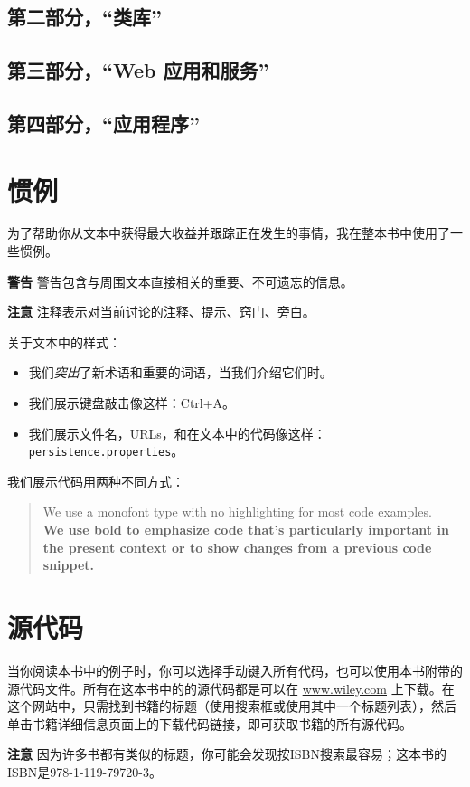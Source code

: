 \subsection*{第二部分，“类库”}

\subsection*{第三部分，“Web 应用和服务”}

\subsection*{第四部分，“应用程序”}

\section*{惯例}
为了帮助你从文本中获得最大收益并跟踪正在发生的事情，我在整本书中使用了一些惯例。

\begin{framed}
    \textbf{警告} 警告包含与周围文本直接相关的重要、不可遗忘的信息。
\end{framed}

\begin{framed}
    \textbf{注意} 注释表示对当前讨论的注释、提示、窍门、旁白。
\end{framed}

关于文本中的样式：
\begin{itemize}
    \item 我们\emph{突出}了新术语和重要的词语，当我们介绍它们时。
    \item 我们展示键盘敲击像这样：Ctrl+A。
    \item 我们展示文件名，URLs，和在文本中的代码像这样：\verb|persistence.properties|。
\end{itemize}

我们展示代码用两种不同方式：
\begin{quote}
    We use a monofont type with no highlighting for most code examples. \\
    {\bfseries\ttfamily We use bold to emphasize code that's particularly important in the present context or to show changes from a previous code snippet.}
\end{quote}

\section*{源代码}
当你阅读本书中的例子时，你可以选择手动键入所有代码，也可以使用本书附带的源代码文件。所有在这本书中的的源代码都是可以在 \url{www.wiley.com} 上下载。在这个网站中，只需找到书籍的标题（使用搜索框或使用其中一个标题列表），然后单击书籍详细信息页面上的下载代码链接，即可获取书籍的所有源代码。
\begin{framed}
    \textbf{注意} 因为许多书都有类似的标题，你可能会发现按ISBN搜索最容易；这本书的ISBN是978-1-119-79720-3。
\end{framed}

